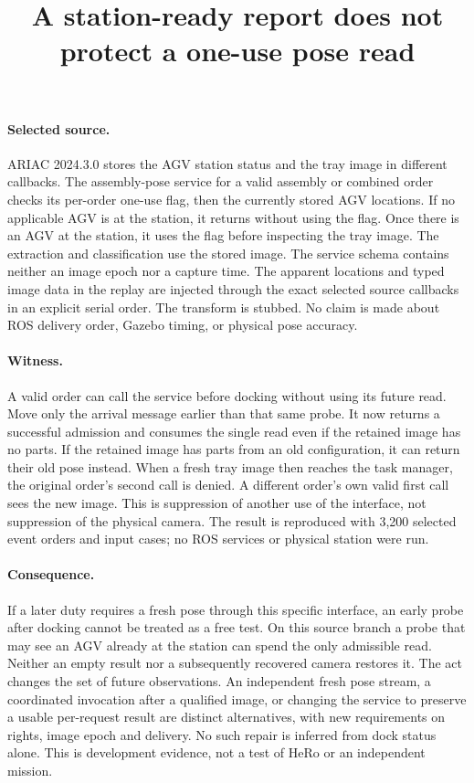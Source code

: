 \documentclass{article}
\begin{document}
\title{A station-ready report does not protect a one-use pose read}
\maketitle

\paragraph{Selected source.}
ARIAC 2024.3.0 stores the AGV station status and the tray image in
different callbacks. The assembly-pose service for a valid assembly
or combined order checks its per-order one-use flag, then the
currently stored AGV locations. If no applicable AGV is at the
station, it returns without using the flag. Once there is an AGV
at the station, it uses the flag before inspecting the tray image.
The extraction and classification use the stored image.
The service schema contains neither an image epoch nor a capture
time. The apparent locations and typed image data in the replay
are injected through the exact selected source callbacks in an
explicit serial order. The transform is stubbed. No claim is made
about ROS delivery order, Gazebo timing, or physical pose accuracy.

\paragraph{Witness.}
A valid order can call the service before docking without using
its future read. Move only the arrival message earlier than that
same probe. It now returns a successful admission and consumes
the single read even if the retained image has no parts. If the
retained image has parts from an old configuration, it can return
their old pose instead. When a fresh tray image then reaches the
task manager, the original order's second call is denied. A
different order's own valid first call sees the new image. This
is suppression of another use of the interface, not suppression
of the physical camera. The result is reproduced with 3,200
selected event orders and input cases; no ROS services or
physical station were run.

\paragraph{Consequence.}
If a later duty requires a fresh pose through this specific
interface, an early probe after docking cannot be treated as a
free test. On this source branch a probe that may see an AGV
already at the station can spend the only admissible read.
Neither an empty result nor a subsequently recovered camera
restores it. The act changes the set of future observations.
An independent fresh pose stream, a coordinated invocation after
a qualified image, or changing the service to preserve a usable
per-request result are distinct alternatives, with new requirements
on rights, image epoch and delivery. No such repair is inferred
from dock status alone. This is development evidence, not a
test of HeRo or an independent mission.
\end{document}

